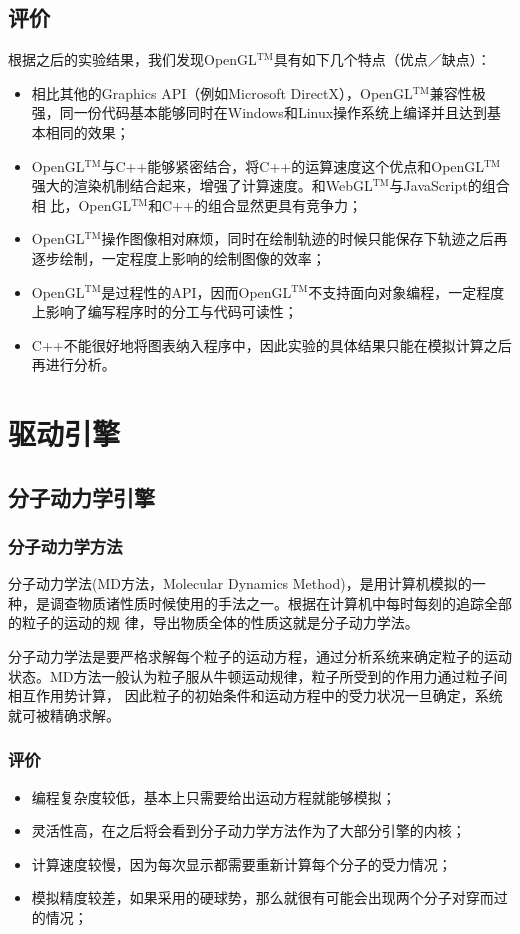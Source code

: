 ﻿\documentclass{article}
\begin{document}
	\subsection{评价}
	根据之后的实验结果，我们发现OpenGL$^{\text{TM}}$具有如下几个特点（优点／缺点）：
	\begin{itemize}
		\item 相比其他的Graphics API（例如Microsoft DirectX），OpenGL$^{\text{TM}}$兼容性极强，同一份代码基本能够同时在Windows和Linux操作系统上编译并且达到基本相同的效果；
		\item OpenGL$^{\text{TM}}$与C++能够紧密结合，将C++的运算速度这个优点和OpenGL$^{\text{TM}}$强大的渲染机制结合起来，增强了计算速度。和WebGL$^{\text{TM}}$与JavaScript的组合相
		比，OpenGL$^{\text{TM}}$和C++的组合显然更具有竞争力；
		\item OpenGL$^{\text{TM}}$操作图像相对麻烦，同时在绘制轨迹的时候只能保存下轨迹之后再逐步绘制，一定程度上影响的绘制图像的效率；
		\item OpenGL$^{\text{TM}}$是过程性的API，因而OpenGL$^{\text{TM}}$不支持面向对象编程，一定程度上影响了编写程序时的分工与代码可读性；
		\item C++不能很好地将图表纳入程序中，因此实验的具体结果只能在模拟计算之后再进行分析。
	\end{itemize}
	\newpage
	\section{驱动引擎}
	\subsection{分子动力学引擎}
	\subsubsection{分子动力学方法}
	\indent 分子动力学法(MD方法，Molecular Dynamics Method)，是用计算机模拟的一种，是调查物质诸性质时候使用的手法之一。根据在计算机中每时每刻的追踪全部的粒子的运动的规
	律，导出物质全体的性质这就是分子动力学法。\par
	\indent 分子动力学法是要严格求解每个粒子的运动方程，通过分析系统来确定粒子的运动状态。MD方法一般认为粒子服从牛顿运动规律，粒子所受到的作用力通过粒子间相互作用势计算，
	因此粒子的初始条件和运动方程中的受力状况一旦确定，系统就可被精确求解。
	\subsubsection{评价}
	\begin{itemize}
		\item 编程复杂度较低，基本上只需要给出运动方程就能够模拟；
		\item 灵活性高，在之后将会看到分子动力学方法作为了大部分引擎的内核；
		\item 计算速度较慢，因为每次显示都需要重新计算每个分子的受力情况；
		\item 模拟精度较差，如果采用的硬球势，那么就很有可能会出现两个分子对穿而过的情况；
	\end{itemize}
\end{document}
